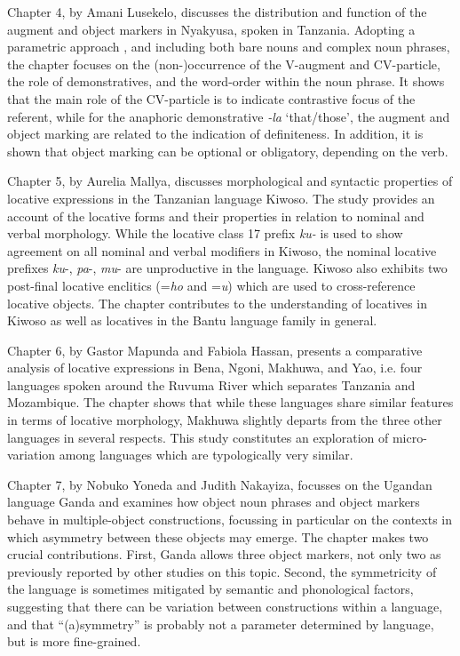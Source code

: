 \documentclass[output=paper]{langscibook}
\begin{document}
Chapter 4, by Amani Lusekelo, discusses the distribution and function of the augment and object markers in Nyakyusa, spoken in Tanzania. Adopting a parametric approach \citep{GuéroisEtAl2017}, and including both bare nouns and complex noun phrases, the chapter focuses on the (non-)occurrence of the V-augment and CV-particle, the role of demonstratives, and the word-order within the noun phrase. It shows that the main role of the CV-particle is to indicate contrastive focus of the referent, while for the anaphoric demonstrative \textit{-la} ‘that/those’, the augment and object marking are related to the indication of definiteness. In addition, it is shown that object marking can be optional or obligatory, depending on the verb.

Chapter 5, by Aurelia Mallya, discusses morphological and syntactic properties of locative expressions in the Tanzanian language Kiwoso. The study provides an account of the locative forms and their properties in relation to nominal and verbal morphology. While the locative class 17 prefix \textit{ku-} is used to show agreement on all nominal and verbal modifiers in Kiwoso, the nominal locative prefixes \textit{ku}-, \textit{pa}-, \textit{mu}- are unproductive in the language. Kiwoso also exhibits two post-final locative enclitics (=\textit{ho} and =\textit{u}) which are used to cross-reference locative objects. The chapter contributes to the understanding of locatives in Kiwoso as well as locatives in the Bantu language family in general.

Chapter 6, by Gastor Mapunda and Fabiola Hassan, presents a comparative analysis of locative expressions in Bena, Ngoni, Makhuwa, and Yao, i.e. four languages spoken around the Ruvuma River which separates Tanzania and Mozambique. The chapter shows that while these languages share similar features in terms of locative morphology, Makhuwa slightly departs from the three other languages in several respects. This study constitutes an exploration of micro-variation among languages which are typologically very similar.   

Chapter 7, by Nobuko Yoneda and Judith Nakayiza, focusses on the Ugandan language Ganda and examines how object noun phrases and object markers behave in multiple-object constructions, focussing in particular on the contexts in which asymmetry between these objects may emerge. The chapter makes two crucial contributions. First, Ganda allows three object markers, not only two as previously reported by other studies on this topic. Second, the symmetricity of the language is sometimes mitigated by semantic and phonological factors, suggesting that there can be variation between constructions within a language, and that “(a)symmetry” is probably not a parameter determined by language, but is more fine-grained.
\end{document}
